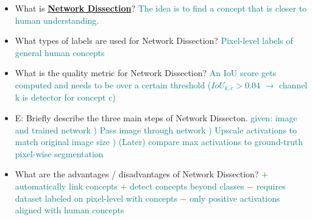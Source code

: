 \documentclass{report}
\newcommand{\asw}[2][teal]{}
\renewcommand{\asw}[2][teal]{\textcolor{#1}{#2}}
\begin{document}
\begin{itemize}
		\item What is \textbf{\underline{Network Dissection}}?
		\asw{\newline The idea is to find a concept that is closer to human understanding.}
		\item What types of labels are used for Network Dissection?
		\asw{\newline Pixel-level labels of general human concepts}
		\item What is the quality metric for Network Dissection?
		\asw{\newline An IoU score gets computed and needs to be over a certain threshold ($IoU_{k,c}>0.04$ $\rightarrow$ channel k is detector for concept c)}
		\item E: Briefly describe the three main steps of Network Dissecton.
		\asw{\newline given: image and trained network
			) Pass image through network
			\newline 2) Upscale activations to match original image size
			\newline 3) (Later) compare max activations to ground-truth pixel-wise segmentation}
		\item What are the advantages / disadvantages of Network Dissection?
		\asw{\newline \textcolor{green}{$+$} automatically link concepts
			\newline \textcolor{green}{$+$} detect concepts beyond classes
			\newline \textcolor{red}{$-$} requires dataset labeled on pixel-level with concepts
			\newline \textcolor{red}{$-$} only positive activations aligned with human concepts}
		

\end{itemize}
\end{document}
